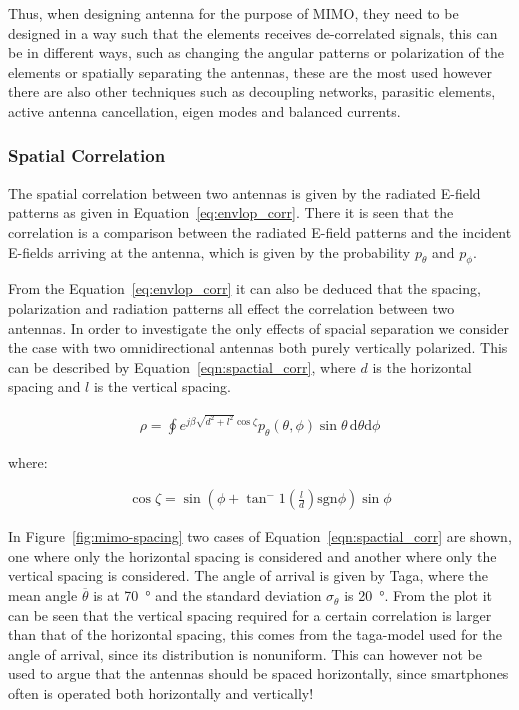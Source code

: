 Thus, when designing antenna for the purpose of MIMO, they need to be designed in a way such that the elements receives de-correlated signals, this can be in different ways, such as changing the angular patterns or polarization of the elements or spatially separating the antennas, these are the most used however there are also other techniques such as decoupling networks, parasitic elements, active antenna cancellation, eigen modes and balanced currents. 

\subsubsection{Spatial Correlation}
The spatial correlation between two antennas  is given by the radiated E-field patterns as given in Equation~\ref{eq:envlop_corr}. There it is seen that the correlation is a comparison between the radiated E-field patterns and the incident E-fields arriving at the antenna, which is given by the probability $p_\theta$ and $p_\phi$. 

From the Equation~\ref{eq:envlop_corr} it can also be deduced that the spacing, polarization and radiation patterns all effect the correlation between two antennas. In order to investigate the only effects of spacial separation we consider the case with two omnidirectional antennas both purely vertically polarized. This can be described by Equation~\ref{eqn:spactial_corr}\cite{Tim2012Practical}, where $d$ is the horizontal spacing and $l$ is the vertical spacing.  

\begin{align}
\label{eqn:spactial_corr}
  \rho = \oint e^{j\beta \sqrt{d^2+l^2}\cos\zeta}p_\theta(\theta,\phi)\sin\theta \, \mathrm{d} \theta \mathrm{d} \phi
\end{align}

where: 

\begin{align*}
\cos \zeta = \sin(\phi + \tan^-1(\frac{l}{d}) \text{sgn}\phi)\sin\phi  
\end{align*}

In Figure~\ref{fig:mimo-spacing} two cases of Equation~\ref{eqn:spactial_corr} are shown, one where only the horizontal spacing is considered and another where only the vertical spacing is considered. The angle of arrival is given by Taga, where the mean angle $\overline{\theta}$ is at \SI{70}{\degree} and the standard deviation $\sigma_\theta$ is \SI{20}{\degree}. From the plot it can be seen that the vertical spacing required for a certain correlation is larger than that of the horizontal spacing, this comes from the taga-model used for the angle of arrival, since its distribution is nonuniform. This can however not be used to argue that the antennas should be spaced horizontally, since smartphones often is operated both horizontally and vertically! 


